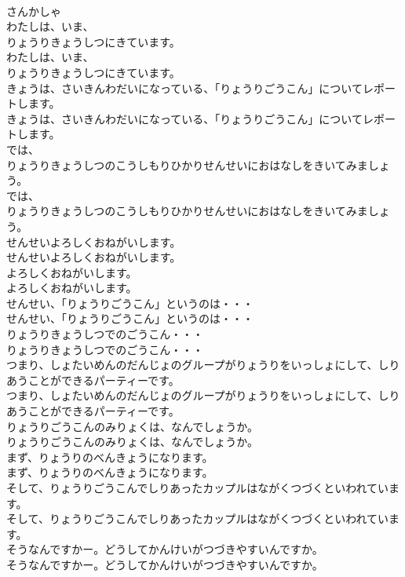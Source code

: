 \documentclass[8pt]{extreport}
\begin{document}
\begin{CJK}{UTF8}{min}
\\	さんかしゃ
\\	わたしは、いま、
\\	りょうりきょうしつにきています。
\\	わたしは、いま、
\\	りょうりきょうしつにきています。
\\	きょうは、さいきんわだいになっている、「りょうりごうこん」についてレポートします。
\\	きょうは、さいきんわだいになっている、「りょうりごうこん」についてレポートします。
\\	では、
\\	りょうりきょうしつのこうしもりひかりせんせいにおはなしをきいてみましょう。
\\	では、
\\	りょうりきょうしつのこうしもりひかりせんせいにおはなしをきいてみましょう。
\\	せんせいよろしくおねがいします。
\\	せんせいよろしくおねがいします。
\\	よろしくおねがいします。
\\	よろしくおねがいします。
\\	せんせい、「りょうりごうこん」というのは・・・
\\	せんせい、「りょうりごうこん」というのは・・・
\\	りょうりきょうしつでのごうこん・・・
\\	りょうりきょうしつでのごうこん・・・
\\	つまり、しょたいめんのだんじょのグループがりょうりをいっしょにして、しりあうことができるパーティーです。
\\	つまり、しょたいめんのだんじょのグループがりょうりをいっしょにして、しりあうことができるパーティーです。
\\	りょうりごうこんのみりょくは、なんでしょうか。
\\	りょうりごうこんのみりょくは、なんでしょうか。
\\	まず、りょうりのべんきょうになります。
\\	まず、りょうりのべんきょうになります。
\\	そして、りょうりごうこんでしりあったカップルはながくつづくといわれています。
\\	そして、りょうりごうこんでしりあったカップルはながくつづくといわれています。
\\	そうなんですかー。どうしてかんけいがつづきやすいんですか。
\\	そうなんですかー。どうしてかんけいがつづきやすいんですか。

\end{CJK}
\end{document}
